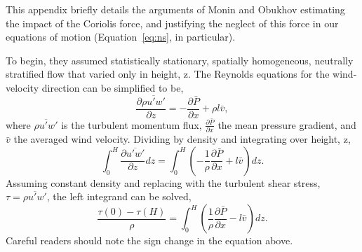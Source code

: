 \label{appendix:coriolis}

This appendix briefly details the arguments of Monin and
Obukhov\cite{monin1954basic} estimating the impact of the Coriolis
force, and justifying the neglect of this force in our equations of
motion (Equation~\ref{eq:ns}, in particular). 

To begin, they assumed statistically stationary, spatially homogeneous,
neutrally stratified flow that varied only in height, z. The Reynolds
equations for the wind-velocity direction can be simplified to be,  
\begin{equation}
 \frac{\partial \overline{\rho u'w'}}{\partial z} = -\frac{\partial
  \bar P}{\partial x} + \rho l \bar v, 
\end{equation}
where $\overline{\rho u'w'}$ is the turbulent momentum flux, $\frac{\partial
\bar P}{\partial x} $  the mean pressure gradient, and $\bar v$ the
averaged wind velocity. Dividing by density and integrating over height,
z, 
\begin{equation}
 \int_0^H \frac{\partial \overline{u'w'}}{\partial z} dz = \int_0^H
  \left( -\frac{1}{\rho} \frac{\partial \bar P}{\partial x} + l \bar v
  \right) dz.  
\end{equation}
Assuming constant density and replacing with the turbulent shear stress,
$\tau = \overline{\rho u'w'}$, the left integrand can be solved,  
\begin{equation}
\frac{\tau(0) - \tau(H)}{\rho} = \int_0^H
  \left( \frac{1}{\rho} \frac{\partial \bar P}{\partial x} - l \bar v
  \right) dz.  
\end{equation}
Careful readers should note the sign change in the equation above. 